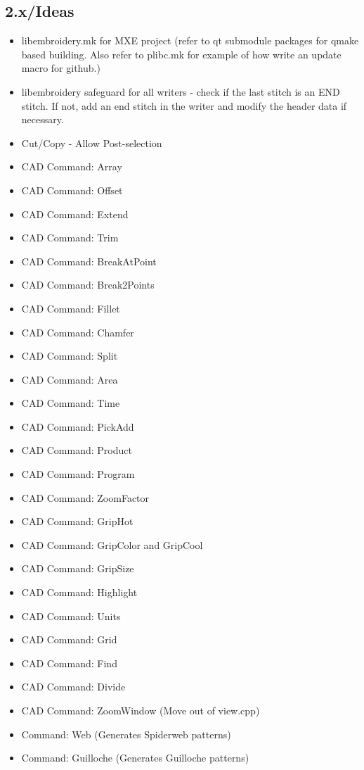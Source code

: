 \documentclass[a4paper]{report}
\begin{document}
\subsection{2.x/Ideas}

\begin{itemize}
\item libembroidery.mk for MXE project (refer to qt submodule packages for qmake based building. Also refer to plibc.mk for example of how write an update macro for github.)
\item libembroidery safeguard for all writers - check if the last stitch is an END stitch. If not, add an end stitch in the writer and modify the header data if necessary.
\item Cut/Copy - Allow Post-selection
\item CAD Command: Array
\item CAD Command: Offset
\item CAD Command: Extend
\item CAD Command: Trim
\item CAD Command: BreakAtPoint
\item CAD Command: Break2Points
\item CAD Command: Fillet
\item CAD Command: Chamfer
\item CAD Command: Split
\item CAD Command: Area
\item CAD Command: Time
\item CAD Command: PickAdd
\item CAD Command: Product
\item CAD Command: Program
\item CAD Command: ZoomFactor
\item CAD Command: GripHot
\item CAD Command: GripColor and GripCool
\item CAD Command: GripSize
\item CAD Command: Highlight
\item CAD Command: Units
\item CAD Command: Grid
\item CAD Command: Find
\item CAD Command: Divide
\item CAD Command: ZoomWindow (Move out of view.cpp)
\item Command: Web (Generates Spiderweb patterns)
\item Command: Guilloche (Generates Guilloche patterns)

\end{itemize}
\end{document}
